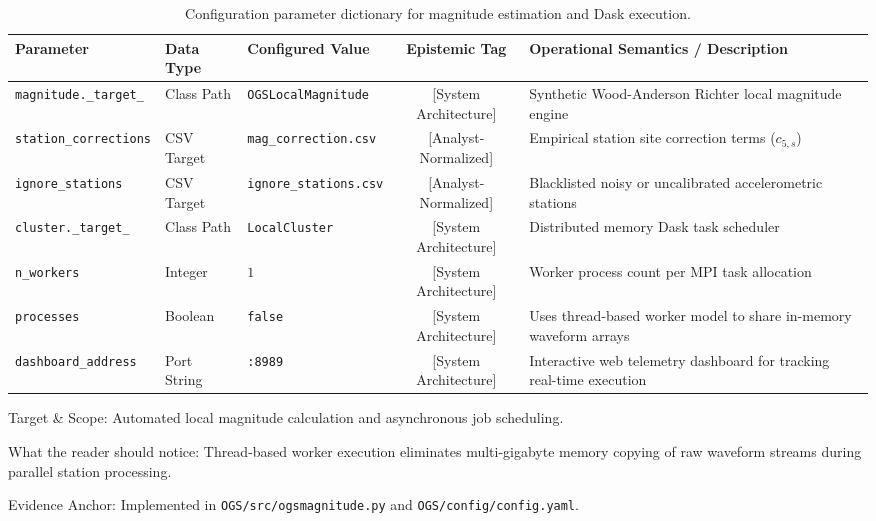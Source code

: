 \begin{table}[htbp]
  \centering
  \small
  \caption{Configuration parameter dictionary for magnitude estimation and Dask execution.}
  \label{tab:app_mag_cluster_dictionary}
  \begin{threeparttable}
    \begin{tabularx}{\linewidth}{l l l c X}
      \toprule
      \textbf{Parameter} & \textbf{Data Type} & \textbf{Configured Value} & \textbf{Epistemic Tag} & \textbf{Operational Semantics / Description} \\
      \midrule
      \texttt{magnitude.\_target\_} & Class Path & \texttt{OGSLocalMagnitude} & [System Architecture] & Synthetic Wood-Anderson Richter local magnitude engine \\
      \texttt{station\_corrections} & CSV Target & \texttt{mag\_correction.csv} & [Analyst-Normalized] & Empirical station site correction terms ($c_{5, s}$) \\
      \texttt{ignore\_stations} & CSV Target & \texttt{ignore\_stations.csv} & [Analyst-Normalized] & Blacklisted noisy or uncalibrated accelerometric stations \\
      \texttt{cluster.\_target\_} & Class Path & \texttt{LocalCluster} & [System Architecture] & Distributed memory Dask task scheduler \\
      \texttt{n\_workers} & Integer & $1$ & [System Architecture] & Worker process count per MPI task allocation \\
      \texttt{processes} & Boolean & \texttt{false} & [System Architecture] & Uses thread-based worker model to share in-memory waveform arrays \\
      \texttt{dashboard\_address} & Port String & \texttt{:8989} & [System Architecture] & Interactive web telemetry dashboard for tracking real-time execution \\
      \bottomrule
    \end{tabularx}
    \begin{tablenotes}[flushleft]
      \footnotesize
      \item Target \& Scope: Automated local magnitude calculation and asynchronous job scheduling.
      \item What the reader should notice: Thread-based worker execution eliminates multi-gigabyte memory copying of raw waveform streams during parallel station processing.
      \item Evidence Anchor: Implemented in \texttt{OGS/src/ogsmagnitude.py} and \texttt{OGS/config/config.yaml}.
    \end{tablenotes}
  \end{threeparttable}
\end{table}

